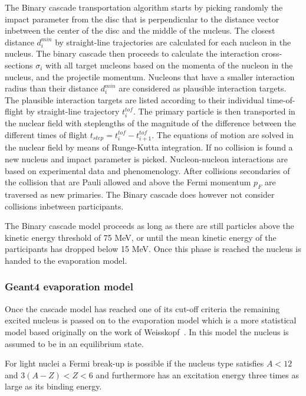 The Binary cascade transportation algorithm starts by picking randomly the impact parameter from the disc that is perpendicular to the distance vector inbetween the center of the disc and the middle of the nucleus. The closest distance $d^{min}_{i}$ by straight-line trajectories are calculated for each nucleon in the nucleus. The binary cascade then proceeds to calculate the interaction cross-sections $\sigma_i$ with all target nucleons based on the momenta of the nucleon in the nucleus, and the projectile momentum. Nucleons that have a smaller interaction radius than their distance $d^{min}_{i}$ are considered as plausible interaction targets. The plausible interaction targets are listed according to their individual time-of-flight by straight-line trajectory $t^{tof}_i$. The primary particle is then transported in the nuclear field with steplengths of the magnitude of the difference between the different times of flight $t_{step} = t^{tof}_i - t^{tof}_{i+1}$. The equations of motion are solved in the nuclear field by means of Runge-Kutta integration. If no collision is found a new nucleus and impact parameter is picked.
Nucleon-nucleon interactions are based on experimental data and phenomenology. After collisions secondaries of the collision that are Pauli allowed and above the Fermi momentum $p_F$ are traversed as new primaries. The Binary cascade does however not consider collisions inbetween participants.

The Binary cascade model proceeds as long as there are still particles above the kinetic energy threshold  of 75 MeV, or until the mean kinetic energy of the participants has dropped below 15 MeV. Once this phase is reached the nucleus is handed to the evaporation model.

\subsubsection{Geant4 evaporation model}

Once the cascade model has reached one of its cut-off criteria the remaining excited nucleus is passed on to the evaporation model which is a more statistical model based originally on the work of Weisskopf~\cite{Weisskopf}. In this model the nucleus is assumed to be in an equilibrium state.

For light nuclei a Fermi break-up is possible if the nucleus type satisfies $A < 12$ and $3(A - Z) < Z < 6$ and furthermore has an excitation energy three times as large as its binding energy.

